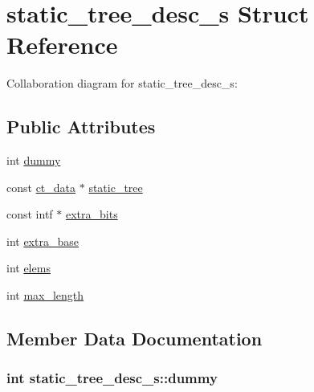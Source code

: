 \hypertarget{structstatic__tree__desc__s}{}\section{static\+\_\+tree\+\_\+desc\+\_\+s Struct Reference}
\label{structstatic__tree__desc__s}


Collaboration diagram for static\+\_\+tree\+\_\+desc\+\_\+s\+:
\subsection*{Public Attributes}
\begin{DoxyCompactItemize}
\item 
int \hyperlink{structstatic__tree__desc__s_aa3662e0ed40c86de246851a7a2483308}{dummy}
\item 
const \hyperlink{deflate_8h_a0a4b5df3b2254c627b8a59e038963118}{ct\+\_\+data} $\ast$ \hyperlink{structstatic__tree__desc__s_a56265073858de4ffe99e32d0f9d38545}{static\+\_\+tree}
\item 
const intf $\ast$ \hyperlink{structstatic__tree__desc__s_a4ec9abd624cbf2bfcc48dfb786925986}{extra\+\_\+bits}
\item 
int \hyperlink{structstatic__tree__desc__s_a1051cc83d9d410ccf21427df9bd85201}{extra\+\_\+base}
\item 
int \hyperlink{structstatic__tree__desc__s_ab4bad1c091188c43413a09f626a5787f}{elems}
\item 
int \hyperlink{structstatic__tree__desc__s_ae767848725194f63fa9cf08142767ad4}{max\+\_\+length}
\end{DoxyCompactItemize}


\subsection{Member Data Documentation}
\hypertarget{structstatic__tree__desc__s_aa3662e0ed40c86de246851a7a2483308}{}
\subsubsection[{dummy}]{\setlength{\rightskip}{0pt plus 5cm}int static\+\_\+tree\+\_\+desc\+\_\+s\+::dummy}\label{structstatic__tree__desc__s_aa3662e0ed40c86de246851a7a2483308}
\hypertarget{structstatic__tree__desc__s_ab4bad1c091188c43413a09f626a5787f}{}
